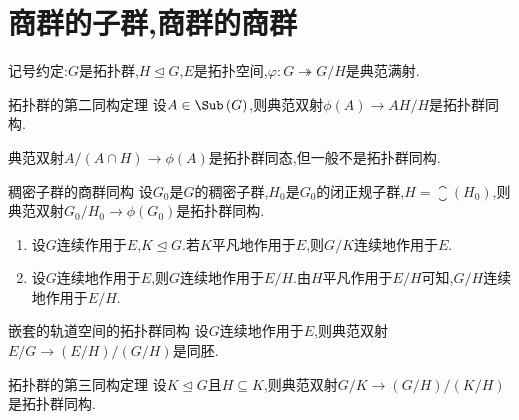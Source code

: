 \section{商群的子群,商群的商群}

记号约定:$G$是拓扑群,$H\unlhd G$,$E$是拓扑空间,$\varphi:G\twoheadrightarrow G/H$是典范满射.

\begin{proposition}{拓扑群的第二同构定理}{}
	设$A\in\Sub\left(G\right)$,则典范双射$\phi\left(A\right)\to AH/H$是拓扑群同构.
\end{proposition}

\begin{remark}{}{}
	典范双射$A/\left(A\cap H\right)\to\phi\left(A\right)$是拓扑群同态,但一般不是拓扑群同构.
\end{remark}

\begin{proposition}{稠密子群的商群同构}{}
	设$G_{0}$是$G$的稠密子群,$H_{0}$是$G_{0}$的闭正规子群,$H=\closure\left(H_{0}\right)$,则典范双射$G_{0}/H_{0}\to\phi\left(G_{0}\right)$是拓扑群同构.
\end{proposition}

\begin{remark}{}{}
	\begin{enumerate}
		\item 设$G$连续作用于$E$,$K\unlhd G$.若$K$平凡地作用于$E$,则$G/K$连续地作用于$E$.
		\item 设$G$连续地作用于$E$,则$G$连续地作用于$E/H$.由$H$平凡作用于$E/H$可知,$G/H$连续地作用于$E/H$.
	\end{enumerate}
\end{remark}

\begin{proposition}{嵌套的轨道空间的拓扑群同构}{}
	设$G$连续地作用于$E$,则典范双射$E/G\to\left(E/H\right)/\left(G/H\right)$是同胚.
\end{proposition}

\begin{corollary}{拓扑群的第三同构定理}{}
	设$K\unlhd G$且$H\subseteq K$,则典范双射$G/K\to\left(G/H\right)/\left(K/H\right)$是拓扑群同构.
\end{corollary}














